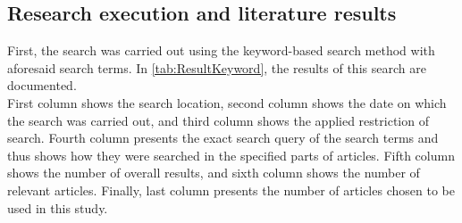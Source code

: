 \subsection*{Research execution and literature results}
\label{subsec:RE}

First, the search was carried out using the keyword-based search method with aforesaid search terms. In \autoref{tab:ResultKeyword}, the results of this search are documented.\\
First column shows the search location, second column shows the date on which the search was carried out, and third column shows the applied restriction of search. Fourth column presents the exact search query of the search terms and thus shows how they were searched in the specified parts of articles. Fifth column shows the number of overall results, and sixth column shows the number of relevant articles. Finally, last column presents the number of articles chosen to be used in this study.

